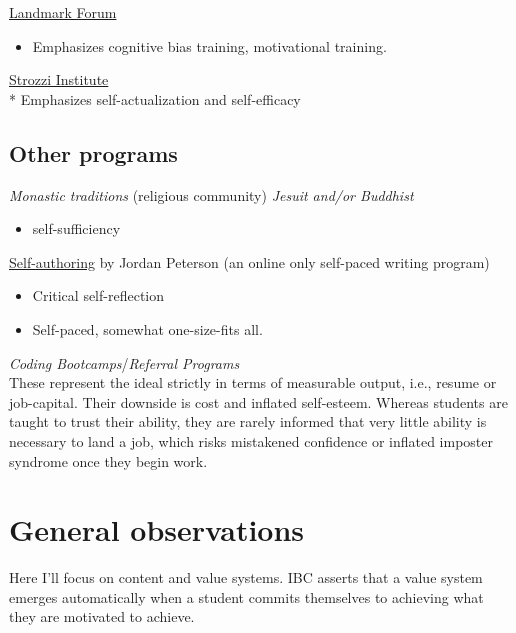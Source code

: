 \documentclass[
]{book}
\providecommand{\tightlist}{%
  \setlength{\itemsep}{0pt}\setlength{\parskip}{0pt}}
\begin{document}
\href{https://www.landmarkworldwide.com/}{Landmark Forum}

\begin{itemize}
\tightlist
\item
  Emphasizes cognitive bias training, motivational training.
\end{itemize}

\href{https://strozziinstitute.com/}{Strozzi Institute}\\
* Emphasizes self-actualization and self-efficacy

\subsection{Other programs}\label{other-programs}

\emph{Monastic traditions} (religious community)
\emph{Jesuit and/or Buddhist}

\begin{itemize}
\tightlist
\item
  self-sufficiency
\end{itemize}

\href{https://www.selfauthoring.com/}{Self-authoring} by Jordan Peterson
(an online only self-paced writing program)

\begin{itemize}
\tightlist
\item
  Critical self-reflection
\item
  Self-paced, somewhat one-size-fits all.
\end{itemize}

\emph{Coding Bootcamps}/\emph{Referral Programs}\\
These represent the ideal strictly in terms of measurable output, i.e., resume or job-capital. Their downside is cost and inflated self-esteem. Whereas students are taught to trust their ability, they are rarely informed that very little ability is necessary to land a job, which risks mistakened confidence or inflated imposter syndrome once they begin work.

\section{General observations}\label{general-observations}

Here I'll focus on content and value systems. IBC asserts that a value system emerges automatically when a student commits themselves to achieving what they are motivated to achieve.
\end{document}
